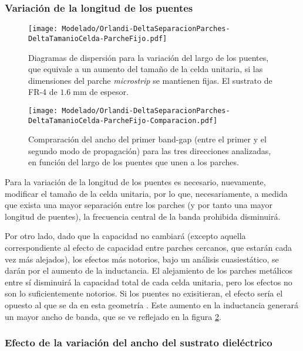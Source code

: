 \subsubsection{Variación de la longitud de los puentes}


\begin{figure}[h]
	\centering
	\texttt{[image: Modelado/Orlandi-DeltaSeparacionParches-DeltaTamanioCelda-ParcheFijo.pdf]}
	\caption{Diagramas de dispersión para la variación del largo de los puentes, que equivale a un aumento del tamaño de la celda unitaria, si las dimensiones del parche \textit{microstrip} se mantienen fijas. El sustrato de FR-4 de $1.6\;\text{mm}$ de espesor.}
	\label{fig:diagdisp-orlandi-variacion-long-puentes}
\end{figure}



\begin{figure}[h]
	\centering
	\texttt{[image: Modelado/Orlandi-DeltaSeparacionParches-DeltaTamanioCelda-ParcheFijo-Comparacion.pdf]}
	\caption{Compraración del ancho del primer band-gap (entre el primer y el segundo modo de propagación) para las tres direcciones analizadas, en función del largo de los puentes que unen a los parches.}
	\label{fig:comparacion-diagdisp-orlandi-long-puentes}
\end{figure}


Para la variación de la longitud de los puentes es necesario, nuevamente, modificar el tamaño de la celda unitaria, por lo que, necesariamente, a medida que exista una mayor separación entre los parches (y por tanto una mayor longitud de puentes), la frecuencia central de la banda prohibida disminuirá.

Por otro lado, dado que la capacidad no cambiará (excepto aquella correspondiente al efecto de capacidad entre parches cercanos, que estarán cada vez más alejados), los efectos más notorios, bajo un análisis cuasiestático, se darán por el aumento de la inductancia. El alejamiento de los parches metálicos entre sí disminuirá la capacidad total de cada celda unitaria, pero los efectos no son lo suficientemente notorios. Si los puentes no exisitieran, el efecto sería el opuesto al que se da en esta geometría \cite{Yang:EBGAntennas}. Este aumento en la inductancia generará un mayor ancho de banda, que se ve reflejado en la figura \ref{fig:comparacion-diagdisp-orlandi-long-puentes}.

\subsubsection{Efecto de la variación del ancho del sustrato dieléctrico}


